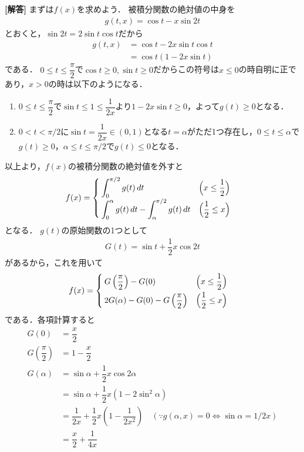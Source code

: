 \documentclass[../../main.tex]{subfiles}
\begin{document}
\begin{oframed}
  
\end{oframed}

{\bf [解答]}
まずは$f(x)$を求めよう．
被積分関数の絶対値の中身を
\begin{align}
  g(t,x)=\cos t-x\sin2t
\end{align}
とおくと，$\sin 2t=2\sin t\cos t$だから
\begin{align}
  g(t,x)
  &= \cos t - 2x\sin t \cos t \\
  &= \cos t \left(1-2x\sin t\right) \label{eq:1}
\end{align}
である．
$0\le t\le\dfrac{\pi}{2}$で$\cos t\ge0,\sin t\ge 0$だからこの符号は$x \le 0$の時自明に正であり，$x > 0$の時は以下のようになる．
\begin{enumerate}
  \item[$x\le\dfrac{1}{2}$の時] $0\le t\le \dfrac{\pi}{2}$で$\sin t\le1\le\dfrac{1}{2x}$より$1-2x\sin t\ge0$，よって$g(t)\ge0$となる．
  \item[$x>\dfrac{1}{2}$の時] $0<t<\pi/2$に$\sin t=\dfrac{1}{2x}\in(0,1)$となる$t=\alpha$がただ1つ存在し，$0\le t\le\alpha$で$g(t)\ge0$，$\alpha\le t\le\pi/2$で$g(t)\le0$となる．
\end{enumerate}
以上より，$f(x)$の被積分関数の絶対値を外すと
\begin{align}
  f(x)&=
  \begin{cases}
    \displaystyle\int_0^{\pi/2}g(t)\,dt & \Bigl(x\le\dfrac{1}{2}\Bigr)\\[2mm]
    \displaystyle\int_0^\alpha g(t)\,dt-\int_\alpha^{\pi/2}g(t)\,dt & \Bigl(\dfrac{1}{2}\le x\Bigr)
  \end{cases} \label{eq:2}
\end{align}
となる．
$g(t)$の原始関数の1つとして
\begin{align}
  G(t)=\sin t+\dfrac{1}{2}x\cos2t
\end{align}
があるから，これを用いて
\begin{align}
  f(x)&=
  \begin{cases}
    \displaystyle G\left(\dfrac{\pi}{2}\right) - G(0)  & \Bigl(x\le\dfrac{1}{2}\Bigr)\\[2mm]
    \displaystyle 2G(\alpha) - G(0) - G\left(\dfrac{\pi}{2}\right)  & \Bigl(\dfrac{1}{2}\le x\Bigr)
  \end{cases} \label{eq:3}
\end{align}
である．各項計算すると
\begin{align}
  G(0) &= \dfrac{x}{2}\\
  G\left(\dfrac{\pi}{2}\right) &= 1 - \dfrac{x}{2} \\
  G(\alpha)
  &= \sin\alpha + \dfrac{1}{2}x\cos 2\alpha \\
  &= \sin\alpha + \dfrac{1}{2}x\left(1-2\sin^2\alpha\right) \\
  &= \dfrac{1}{2x} + \dfrac{1}{2}x\left(1-\dfrac{1}{2x^2}\right)\quad (\because g(\alpha,x)=0 \iff \sin\alpha=1/2x) \\
  &= \dfrac{x}{2} + \dfrac{1}{4x}
\end{align}
\end{document}
